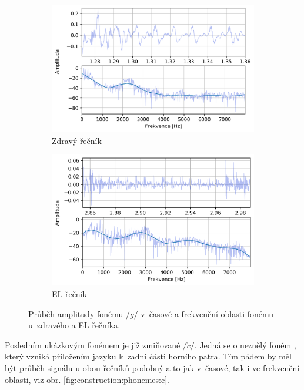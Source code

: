 \begin{figure}[htpb]
  \centering
  \begin{subfigure}[b]{0.45\textwidth}
    \includegraphics[width=\textwidth]{./parts/ch5-construction/img/signal-normal_g.png}
    \caption{Zdravý řečník}
    \label{fig:construction:phonemes:g:normal}
  \end{subfigure}
  \begin{subfigure}[b]{0.45\textwidth}
    \includegraphics[width=\textwidth]{./parts/ch5-construction/img/signal-el_g.png}
    \caption{EL řečník}
    \label{fig:construction:phonemes:g:el}
  \end{subfigure}
  \caption[Průběh amplitudy fonému $/g/$ zdravého a EL řečníka.]{Průběh amplitudy fonému $/g/$ v~časové a frekvenční oblasti fonému u~zdravého a EL řečníka.}
  \label{fig:construction:phonemes:g}
\end{figure}

Posledním ukázkovým fonémem je již zmiňované $/\check{c}/$.
Jedná se o neznělý foném , který vzniká přiložením jazyku k~zadní části horního patra.
Tím pádem by měl být průběh signálu u obou řečníků podobný a to jak v~časové, tak i ve frekvenční oblasti, viz obr. \ref{fig:construction:phonemes:c}.

